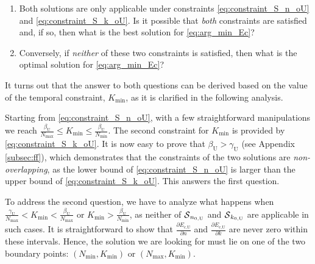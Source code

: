 \documentclass[twocolumn,english]{IEEEtran}
\theoremstyle{plain}
\theoremstyle{definition}
\begin{document}
\begin{enumerate}[leftmargin=*] 
\item Both solutions are only applicable under constraints \eqref{eq:constraint_S_n_oU}
and \eqref{eq:constraint_S_k_oU}. Is it possible that \emph{both}
constraints are satisfied and, if so, then what is the best solution
for \eqref{eq:arg_min_Ec}? 

\item Conversely, if \emph{neither} of these two constraints is satisfied,
then what is the optimal solution for \eqref{eq:arg_min_Ec}? 

\end{enumerate}

It turns out that the answer to both questions can be derived based
on the value of the temporal constraint, $K_{\text{min}}$, as it
is clarified in the following analysis.

Starting from \eqref{eq:constraint_S_n_oU}, with a few straightforward
manipulations we reach $\frac{\beta_{\text{U}}}{N_{\max}}\le K_{\text{min}}\le\frac{\beta_{\text{U}}}{N_{\min}}$.
The second constraint for $K_{\text{min}}$ is provided by \eqref{eq:constraint_S_k_oU}.
It is now easy to prove that $\beta_{\text{U}}>\gamma_{\textrm{U}}$
(see Appendix \ref{subsec:ff}), which demonstrates that the constraints
of the two solutions are \emph{non-overlapping}, as the lower bound
of \eqref{eq:constraint_S_n_oU} is larger than the upper bound of
\eqref{eq:constraint_S_k_oU}. This answers the first question.

To address the second question, we have to analyze what happens when
$\frac{\gamma_{\textrm{U}}}{N_{\text{max}}}<K_{\text{min}}<\frac{\beta_{\text{U}}}{N_{\max}}$
or $K_{\text{min}}>\frac{\beta_{\text{U}}}{N_{\min}}$, as neither
of $\text{\ensuremath{\mathcal{S}}}_{n_{0,\text{U}}}$ and $\text{\ensuremath{\mathcal{S}}}_{k_{0,\text{U}}}$
are applicable in such cases. It is straightforward to show that $\frac{\partial E_{\text{c,U}}}{\partial n}$
and $\frac{\partial E_{\text{c,U}}}{\partial k}$ are never zero within
these intervals. Hence, the solution we are looking for must lie on
one of the two boundary points: $\left(N_{\text{min}},K_{\text{min}}\right)$
or $\left(N_{\text{max}},K_{\text{min}}\right)$.
\end{document}
